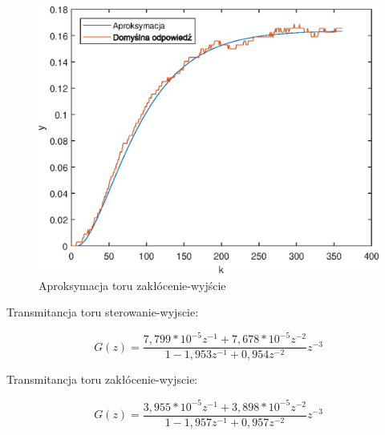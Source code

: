 \begin{figure}[h!]
	\centering
	\includegraphics[scale=1]{Rys/LAB12_AproxedZ.eps}
	\caption{Aproksymacja toru zakłócenie-wyjście}
	\label{zak_odp}
\end{figure}
\FloatBarrier


\FloatBarrier

Transmitancja toru sterowanie-wyjscie:

\begin{equation}
G(z)= \frac{7,799*10^{-5}z^{-1}+7,678*10^{-5}z^{-2}} {1-1,953z^{-1}+0,954z^{-2}}z^{-3}
\label{wzor_11}
\end{equation}

Transmitancja toru zakłócenie-wyjscie:

\begin{equation}
G(z)= \frac{3,955*10^{-5}z^{-1}+3,898*10^{-5}z^{-2}} {1-1,957z^{-1}+0,957z^{-2}}z^{-3}
\label{wzor_12}
\end{equation}


